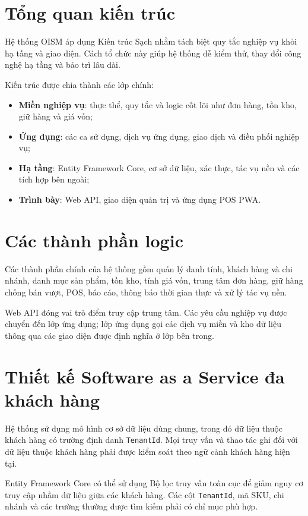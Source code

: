 \section{Tổng quan kiến trúc}

Hệ thống OISM áp dụng Kiến trúc Sạch nhằm tách biệt quy tắc nghiệp vụ khỏi hạ tầng và giao diện.
Cách tổ chức này giúp hệ thống dễ kiểm thử, thay đổi công nghệ hạ tầng và bảo trì lâu dài.

Kiến trúc được chia thành các lớp chính:

\begin{itemize}
    \item \textbf{Miền nghiệp vụ}: thực thể, quy tắc và logic cốt lõi như đơn hàng, tồn kho, giữ hàng và giá vốn;
    \item \textbf{Ứng dụng}: các ca sử dụng, dịch vụ ứng dụng, giao dịch và điều phối nghiệp vụ;
    \item \textbf{Hạ tầng}: Entity Framework Core, cơ sở dữ liệu, xác thực, tác vụ nền và các tích hợp bên ngoài;
    \item \textbf{Trình bày}: Web API, giao diện quản trị và ứng dụng POS PWA.
\end{itemize}

\section{Các thành phần logic}

Các thành phần chính của hệ thống gồm quản lý danh tính, khách hàng và chi nhánh, danh mục
sản phẩm, tồn kho, tính giá vốn, trung tâm đơn hàng, giữ hàng chống bán vượt, POS, báo cáo,
thông báo thời gian thực và xử lý tác vụ nền.

Web API đóng vai trò điểm truy cập trung tâm. Các yêu cầu nghiệp vụ được chuyển đến lớp ứng
dụng; lớp ứng dụng gọi các dịch vụ miền và kho dữ liệu thông qua các giao diện được định nghĩa
ở lớp bên trong.

\section{Thiết kế Software as a Service đa khách hàng}

Hệ thống sử dụng mô hình cơ sở dữ liệu dùng chung, trong đó dữ liệu thuộc khách hàng có trường
định danh \texttt{TenantId}. Mọi truy vấn và thao tác ghi đối với dữ liệu thuộc khách hàng phải
được kiểm soát theo ngữ cảnh khách hàng hiện tại.

Entity Framework Core có thể sử dụng Bộ lọc truy vấn toàn cục để giảm nguy cơ truy cập nhầm
dữ liệu giữa các khách hàng. Các cột \texttt{TenantId}, mã SKU, chi nhánh và các trường thường
được tìm kiếm phải có chỉ mục phù hợp.

